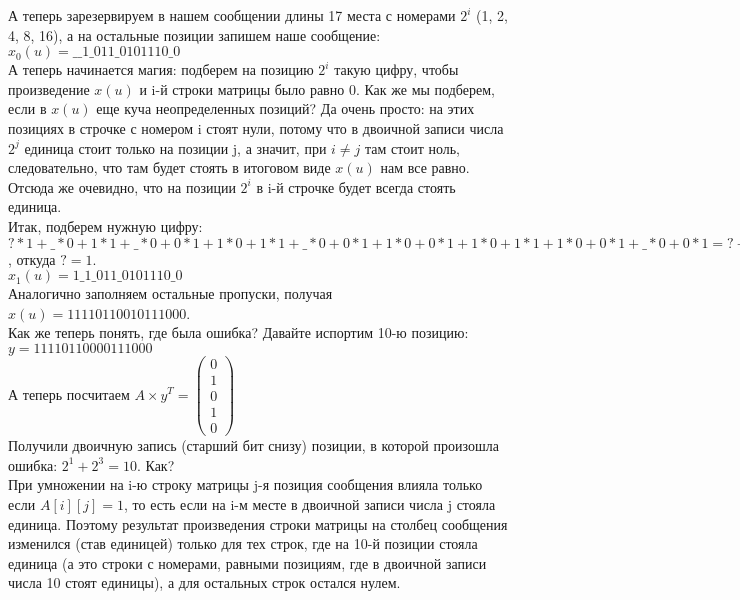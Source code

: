А теперь зарезервируем в нашем сообщении длины 17 места с номерами $2^i$ (1, 2, 4, 8, 16), а на остальные позиции запишем наше сообщение:\\
$x_0(u) = \_\_1\_011\_0101110\_0$\\
А теперь начинается магия: подберем на позицию $2^i$ такую цифру, чтобы произведение $x(u)$ и i-й строки матрицы было равно 0. Как же мы подберем, если в $x(u)$ еще куча неопределенных позиций? Да очень просто: на этих позициях в строчке с номером i стоят нули, потому что в двоичной записи числа $2^j$ единица стоит только на позиции j, а значит, при $i \not= j$ там стоит ноль, следовательно, что там будет стоять в итоговом виде $x(u)$ нам все равно. Отсюда же очевидно, что на позиции $2^i$ в i-й строчке будет всегда стоять единица.\\
Итак, подберем нужную цифру:\\
$? * 1 + \_ * 0 + 1 * 1 + \_ * 0 + 0 * 1 + 1 * 0 + 1 * 1 + \_ * 0 + 0 * 1 + 1 * 0 + 0 * 1 + 1 * 0 + 1 * 1 + 1 * 0 + 0 * 1 + \_ * 0 + 0 * 1 = ? + 1 + 1 + 1 = 1 + ? = 0$, откуда $? = 1$.\\
$x_1(u) = 1\_1\_011\_0101110\_0$\\
Аналогично заполняем остальные пропуски, получая $x(u) = 11110110010111000$.\\
Как же теперь понять, где была ошибка? Давайте испортим 10-ю позицию:\\
$y = 11110110000111000$\\
А теперь посчитаем $A \times y^T = \left( \begin{array}{c}
0 \\ 1 \\ 0 \\ 1 \\ 0 \end{array} \right)$\\
Получили двоичную запись (старший бит снизу) позиции, в которой произошла ошибка: $2^1 + 2^3 = 10$. Как?\\
При умножении на i-ю строку матрицы j-я позиция сообщения влияла только если $A[i][j] = 1$, то есть если на i-м месте в двоичной записи числа j стояла единица. Поэтому результат произведения строки матрицы на столбец сообщения изменился (став единицей) только для тех строк, где на 10-й позиции стояла единица (а это строки с номерами, равными позициям, где в двоичной записи числа 10 стоят единицы), а для остальных строк остался нулем.
